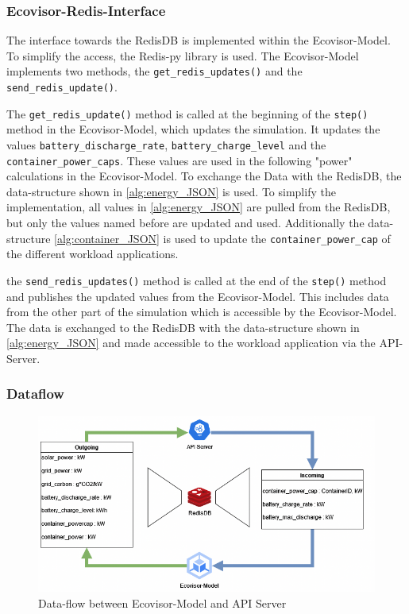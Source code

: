 \subsubsection{Ecovisor-Redis-Interface}
The interface towards the RedisDB is implemented within the Ecovisor-Model. To simplify the access, the Redis-py library \cite{Redis-py} is used. The Ecovisor-Model implements two methods, the \texttt{get\_redis\_updates()} and the \texttt{send\_redis\_update()}. 

The \texttt{get\_redis\_update()} method is called at the beginning of the \texttt{step()} method in the Ecovisor-Model, which updates the simulation. It updates the values \texttt{battery\_discharge\_rate}, \texttt{battery\_charge\_level} and the \texttt{container\_power\_caps}. These values are used in the following "power" calculations in the Ecovisor-Model. To exchange the Data with the RedisDB, the data-structure shown in \ref{alg:energy_JSON} is used. To simplify the implementation, all values in \ref{alg:energy_JSON} are pulled from the RedisDB, but only the values named before are updated and used. Additionally the data-structure \ref{alg:container_JSON} is used to update the \texttt{container\_power\_cap} of the different workload applications. 

the \texttt{send\_redis\_updates()} method is called at the end of the \texttt{step()} method and  publishes the updated values from the Ecovisor-Model. This includes data from the other part of the simulation which is accessible by the Ecovisor-Model.
The data is exchanged to the RedisDB with the data-structure shown in \ref{alg:energy_JSON} and made accessible to the workload application via the API-Server. 

\subsubsection{Dataflow}
\label{subsec:dataflow}
\begin{figure}
    \centering
    \includegraphics[width=\linewidth]{figures/Dataflow.drawio.png}
    \caption{Data-flow between Ecovisor-Model and API Server}
    \label{fig:dataflow}
\end{figure}

